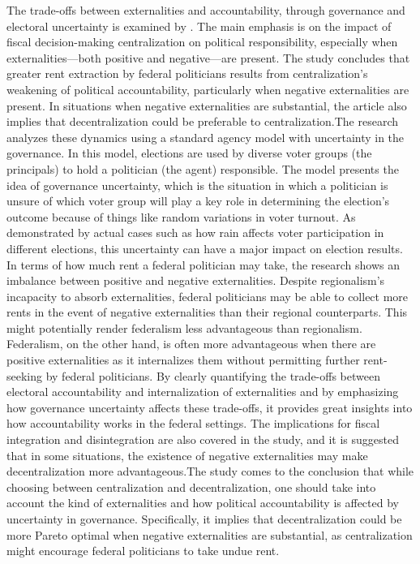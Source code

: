 The trade-offs between externalities and accountability, through governance and electoral uncertainty is examined by  . The main emphasis is on the impact of fiscal decision-making centralization on political responsibility, especially when externalities—both positive and negative—are present. The study concludes that greater rent extraction by federal politicians results from centralization's weakening of political accountability, particularly when negative externalities are present. In situations when negative externalities are substantial, the article also implies that decentralization could be preferable to centralization.The research analyzes these dynamics using a standard agency model with uncertainty in the governance. In this model, elections are used by diverse voter groups (the principals) to hold a politician (the agent) responsible. The model presents the idea of governance uncertainty, which is the situation in which a politician is unsure of which voter group will play a key role in determining the election's outcome because of things like random variations in voter turnout. As demonstrated by actual cases such as how rain affects voter participation in different elections, this uncertainty can have a major impact on election results. In terms of how much rent a federal politician may take, the research shows an imbalance between positive and negative externalities. Despite regionalism's incapacity to absorb externalities, federal politicians may be able to collect more rents in the event of negative externalities than their regional counterparts. This might potentially render federalism less advantageous than regionalism. Federalism, on the other hand, is often more advantageous when there are positive externalities as it internalizes them without permitting further rent-seeking by federal politicians. By clearly quantifying the trade-offs between electoral accountability and internalization of externalities and by emphasizing how governance uncertainty affects these trade-offs, it provides great insights into how accountability works in the federal settings. The implications for fiscal integration and disintegration are also covered in the study, and it is suggested that in some situations, the existence of negative externalities may make decentralization more advantageous.The study comes to the conclusion that while choosing between centralization and decentralization, one should take into account the kind of externalities and how political accountability is affected by uncertainty in governance. Specifically, it implies that decentralization could be more Pareto optimal when negative externalities are substantial, as centralization might encourage federal politicians to take undue rent.\\
